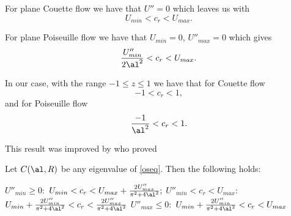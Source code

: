 For plane Couette flow we have that $ U'' = 0 $ which leaves us with
\begin{equation}
    U_{min} < c_r < U_{max}.
\end{equation}

For plane Poiseuille flow we have that $ U_{min} = 0 $, $ U''_{max} = 0 $ which gives
\begin{equation}
    \frac{U''_{min}}{2 \al^2} < c_r < U_{max}.
\end{equation}

In our case, with the range $ -1 \leq z \leq 1 $ we have that for Couette flow
\begin{equation}
    -1 < c_r < 1,
\end{equation}
and for Poiseuille flow
\begin{equation}
    \frac{-1}{\al^2} < c_r < 1.
\end{equation}

This result was improved by \citet{joseph1968eigenvalue, joseph1969eigenvalue} who proved

\begin{theorem} 
Let $C(\al, R)$ be any eigenvalue of \eqref{oseq}. Then the following holds:
\begin{outline}
    \1 $ U''_{min} \geq 0: $
        \2 $ U_{min} < c_r < U_{max} + \frac{2 U''_{max}}{\pi^2 + 4 \al^2}; $
    \1 $ U''_{min} < c_r < U_{max}: $
        \2 $ U_{min} + \frac{2 U''_{min}}{\pi^2 + 4 \al^2} < c_r < \frac{2 U''_{max}}{\pi^2 + 4 \al^2} $
    \1 $ U''_{max} \leq 0: $
        \2 $ U_{min} + \frac{2 U''_{min}}{\pi^2 + 4 \al^2} < c_r < U_{max} $
\end{outline}
\end{theorem}

